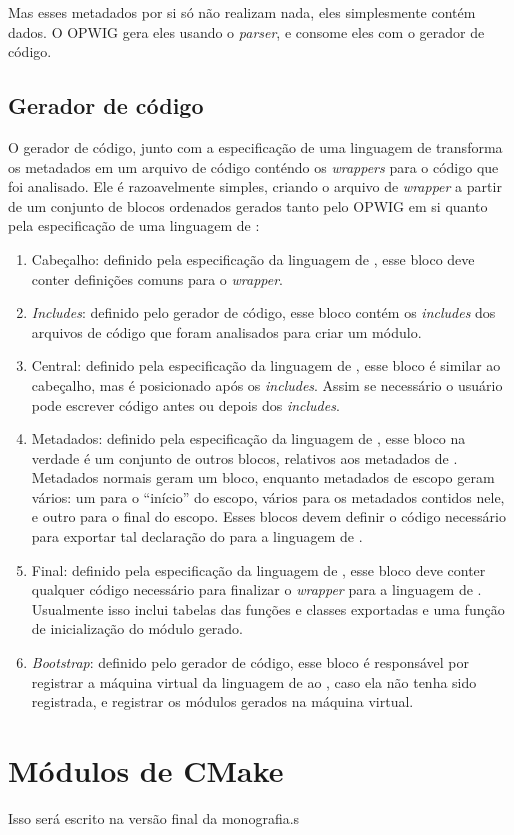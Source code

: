   Mas esses metadados por si só não realizam nada, eles simplesmente contém dados. O OPWIG gera 
  eles usando o \textit{parser}, e consome eles com o gerador de código.
  
  \subsection{Gerador de código}
  O gerador de código, junto com a especificação de uma linguagem de \script{} transforma os metadados
  em um arquivo de código \CXX{} conténdo os \textit{wrappers} para o código que foi analisado. Ele 
  é razoavelmente simples, criando o arquivo de \textit{wrapper} a partir de um conjunto de blocos
  ordenados gerados tanto pelo OPWIG em si quanto pela especificação de uma linguagem de \script{}:
  \begin{enumerate}
    \item Cabeçalho: definido pela especificação da linguagem de \script{}, esse bloco deve conter
      definições comuns para o \textit{wrapper}.
    \item \textit{Includes}: definido pelo gerador de código, esse bloco contém os \textit{includes}
      dos arquivos de código que foram analisados para criar um módulo.
    \item Central: definido pela especificação da linguagem de \script{}, esse bloco é similar ao 
      cabeçalho, mas é posicionado após os \textit{includes}. Assim se necessário o usuário pode
      escrever código antes ou depois dos \textit{includes}.
    \item Metadados: definido pela especificação da linguagem de \script{}, esse bloco na verdade é
      um conjunto de outros blocos, relativos aos metadados de \CXX{}. Metadados normais geram um
      bloco, enquanto metadados de escopo geram vários: um para o ``início'' do escopo, vários
      para os metadados contidos nele, e outro para o final do escopo. Esses blocos devem definir
      o código necessário para exportar tal declaração do \CXX{} para a linguagem de \script{}.
    \item Final: definido pela especificação da linguagem de \script{}, esse bloco deve conter
      qualquer código necessário para finalizar o \textit{wrapper} para a linguagem de \script{}.
      Usualmente isso inclui tabelas das funções e classes exportadas e uma função de inicialização
      do módulo gerado.
    \item \textit{Bootstrap}: definido pelo gerador de código, esse bloco é responsável por
      registrar a máquina virtual da linguagem de \script{} ao \SMgr{}, caso ela não tenha sido
      registrada, e registrar os módulos gerados na máquina virtual.
  \end{enumerate}
  

  \section{Módulos de CMake}
  
    Isso será escrito na versão final da monografia.s
